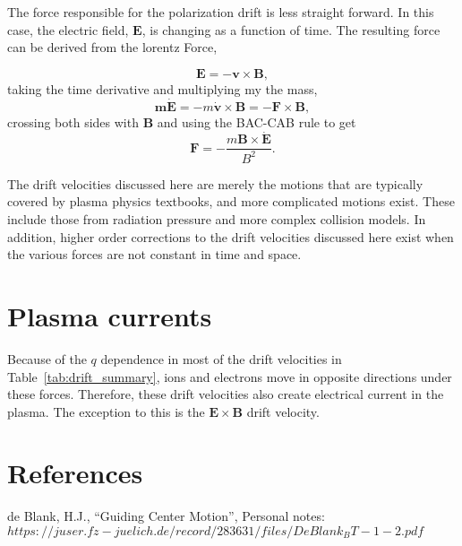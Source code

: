 \documentclass[12pt]{iopart}
\begin{document}
The force responsible for the polarization drift is less straight forward.  In this case, the electric field, $\mathbf{E}$, is changing as a function of time.  The resulting force can be derived from the lorentz Force,

\begin{equation*}
\mathbf{E} = - \mathbf{v} \times \mathbf{B},
\end{equation*}
taking the time derivative and multiplying my the mass,
\begin{equation*}
\mathbf{m\mathbf{\dot{E}}} = - m\mathbf{\dot{v}} \times \mathbf{B} = - \mathbf{F} \times \mathbf{B},
\end{equation*}
crossing both sides with $\mathbf{B}$ and using the BAC-CAB rule to get 
\begin{equation}
\mathbf{F} = - \frac{m \mathbf{B} \times \mathbf{\dot{E}}}{B^2}.
\end{equation}

The drift velocities discussed here are merely the motions that are typically covered by plasma physics textbooks, and more complicated motions exist.  These include those from radiation pressure and more complex collision models.  In addition, higher order corrections to the drift velocities discussed here exist when the various forces are not constant in time and space.  

\section{Plasma currents}

Because of the $q$ dependence in most of the drift velocities in Table~\ref{tab:drift_summary}, ions and electrons move in opposite directions under these forces.  Therefore, these drift velocities also create electrical current in the plasma.  The exception to this is the $\mathbf{E} \times \mathbf{B}$ drift velocity. 

\section*{References}
\begin{thebibliography}{widest entry}
 de Blank, H.J., ``Guiding Center Motion'', Personal notes: $https://juser.fz-juelich.de/record/283631/files/DeBlank_BT-1-2.pdf$
\end{thebibliography}
\end{document}
